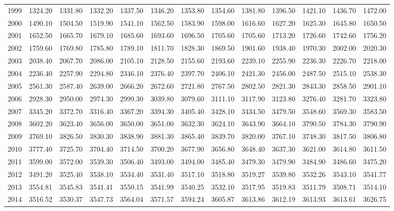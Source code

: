 \begin{longtable}{rrrrrrrrrrrrr}
  1999 & 1324.20 & 1331.80 & 1332.20 & 1337.50 & 1346.20 & 1353.80 & 1354.60 & 1381.80 & 1396.50 & 1421.10 & 1436.70 & 1472.00 \\ 
  2000 & 1490.10 & 1504.50 & 1519.90 & 1541.10 & 1562.50 & 1583.90 & 1598.00 & 1616.60 & 1627.20 & 1625.30 & 1645.80 & 1650.50 \\ 
  2001 & 1652.50 & 1665.70 & 1679.10 & 1685.60 & 1693.60 & 1696.50 & 1705.60 & 1705.60 & 1713.20 & 1726.60 & 1742.60 & 1756.20 \\ 
  2002 & 1759.60 & 1769.80 & 1785.80 & 1789.10 & 1811.70 & 1828.30 & 1869.50 & 1901.60 & 1938.40 & 1970.30 & 2002.00 & 2020.30 \\ 
  2003 & 2038.40 & 2067.70 & 2086.00 & 2105.10 & 2128.50 & 2155.60 & 2193.60 & 2239.10 & 2255.90 & 2236.30 & 2226.70 & 2218.00 \\ 
  2004 & 2236.40 & 2257.90 & 2294.80 & 2346.10 & 2376.40 & 2397.70 & 2406.10 & 2421.30 & 2456.00 & 2487.50 & 2515.10 & 2538.30 \\ 
  2005 & 2561.30 & 2587.40 & 2639.00 & 2666.20 & 2672.60 & 2721.80 & 2767.50 & 2802.50 & 2821.30 & 2843.30 & 2858.50 & 2901.10 \\ 
  2006 & 2928.30 & 2950.00 & 2974.30 & 2999.30 & 3039.80 & 3079.60 & 3111.10 & 3117.90 & 3123.80 & 3276.40 & 3281.70 & 3323.80 \\ 
  2007 & 3345.20 & 3372.70 & 3316.40 & 3367.20 & 3394.30 & 3405.40 & 3428.10 & 3434.50 & 3479.50 & 3548.60 & 3569.30 & 3583.50 \\ 
  2008 & 3602.20 & 3623.40 & 3656.00 & 3650.00 & 3651.00 & 3632.30 & 3624.10 & 3643.90 & 3664.10 & 3790.50 & 3784.30 & 3790.90 \\ 
  2009 & 3769.10 & 3826.50 & 3830.30 & 3838.90 & 3881.30 & 3865.40 & 3839.70 & 3820.00 & 3767.10 & 3748.30 & 3817.50 & 3806.80 \\ 
  2010 & 3777.40 & 3725.70 & 3704.40 & 3714.50 & 3700.20 & 3677.90 & 3656.80 & 3648.40 & 3637.30 & 3621.00 & 3614.80 & 3611.50 \\ 
  2011 & 3599.00 & 3572.00 & 3539.30 & 3506.40 & 3493.00 & 3494.00 & 3485.40 & 3479.30 & 3479.90 & 3484.90 & 3486.60 & 3475.20 \\ 
  2012 & 3491.20 & 3525.40 & 3538.10 & 3534.40 & 3531.40 & 3517.10 & 3518.80 & 3519.27 & 3539.80 & 3532.26 & 3543.10 & 3541.77 \\ 
  2013 & 3554.81 & 3545.83 & 3541.41 & 3550.15 & 3541.99 & 3540.25 & 3532.10 & 3517.95 & 3519.83 & 3511.79 & 3508.71 & 3514.10 \\ 
  2014 & 3516.52 & 3530.37 & 3547.73 & 3564.04 & 3571.57 & 3594.24 & 3605.87 & 3613.86 & 3612.19 & 3613.93 & 3613.61 & 3626.75 \\ 

\end{longtable}
